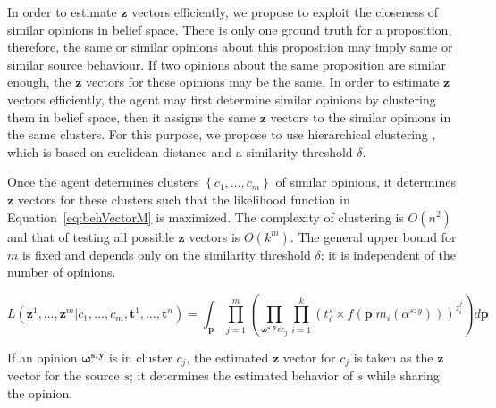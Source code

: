 \documentclass[a4,12pt]{ozu-thesis}
\begin{document}
In order to estimate $\mathbf{z}$ vectors efficiently, we propose to exploit the closeness of similar opinions in belief space. There is only one ground truth for a proposition, therefore, the same or similar opinions about this proposition may imply same or similar source behaviour. If two opinions about the same proposition are similar enough, the $\mathbf{z}$ vectors for these opinions may be the same. In order to estimate $\mathbf{z}$ vectors efficiently, the agent may first determine similar opinions by clustering them in belief space, then it assigns the same  $\mathbf{z}$ vectors to the similar opinions in the same clusters. For this purpose, we propose to use hierarchical clustering \cite{webb}, which is based on euclidean distance and a similarity threshold $\delta$.

Once the agent determines clusters $\left \{ c_{1},\ldots,c_{m} \right \}$ of similar opinions, it determines $\mathbf{z}$ vectors for these clusters such that the likelihood function in Equation~\ref{eq:behVectorM} is maximized. The complexity of clustering is $O\left ( n^{2} \right )$ and that of testing all possible $\mathbf{z}$ vectors is $O\left ( k^{m} \right )$. The general upper bound for $m$ is fixed and depends only on the similarity threshold $\delta$; it is independent of the number of opinions.

\begin{equation}
\label{eq:behVectorM}
L\left ( \mathbf{z}^{1},\ldots,\mathbf{z}^{m}| c_{1},\ldots,c_{m} ,\mathbf{t}^{1},\ldots,\mathbf{t}^{n} \right ) = \int_{\mathbf{p}}\prod_{j=1}^{m}\left ( \prod_{\mathbf{\omega ^{s:y}}\epsilon c_{j}} \prod_{i=1}^{k}\left ( t_{i}^{s}\times f\left ( \mathbf{p}|m_{i}\left ( \alpha^{s:y} \right ) \right ) \right )^{z_{i}^{j}}\right )d\mathbf{p}
\end{equation}


If an opinion $\mathbf{\omega ^{s:y}}$ is in cluster $c_{j}$, the estimated $\mathbf{z}$ vector for $c_{j}$ is taken as the $\mathbf{z}$ vector for the source $s$; it determines the estimated behavior of $s$ while sharing the opinion.  
\end{document}
